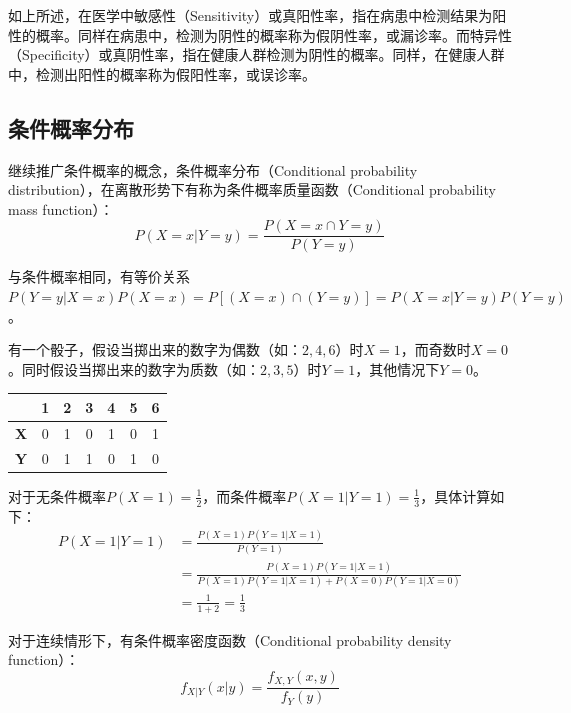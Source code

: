 \documentclass[11pt]{article}
\begin{document}
\begin{example}
\begin{remark}
        如上所述，在医学中敏感性（Sensitivity）或真阳性率，指在病患中检测结果为阳性的概率。同样在病患中，检测为阴性的概率称为假阴性率，或漏诊率。而特异性（Specificity）或真阴性率，指在健康人群检测为阴性的概率。同样，在健康人群中，检测出阳性的概率称为假阳性率，或误诊率。
    \end{remark}
\end{example}

\subsection{条件概率分布}

继续推广条件概率的概念，条件概率分布（Conditional probability distribution），在离散形势下有称为条件概率质量函数（Conditional probability mass function）：
\begin{equation*}
    P(X=x|Y=y) = \frac{P(X=x\cap Y=y)}{P(Y=y)}
\end{equation*}

与条件概率相同，有等价关系$P(Y=y|X=x)P(X=x) = P\left[(X=x)\cap (Y=y)\right] = P(X=x|Y=y)P(Y=y)$。

\begin{example}
    有一个骰子，假设当掷出来的数字为偶数（如：$2,4,6$）时$X=1$，而奇数时$X=0$。同时假设当掷出来的数字为质数（如：$2,3,5$）时$Y=1$，其他情况下$Y=0$。
    \begin{table}[ht!]
    \centering
    \begin{tabular}{@{}ccccccc@{}}
    \toprule
    & \textbf{1} & \textbf{2} & \textbf{3} & \textbf{4} & \textbf{5} & \textbf{6} \\ \midrule
    \textbf{X} & 0 & 1 & 0 & 1 & 0 & 1 \\
    \textbf{Y} & 0 & 1 & 1 & 0 & 1 & 0 \\ \bottomrule
    \end{tabular}
    \end{table}
    
    对于无条件概率$P(X=1) = \frac{1}{2}$，而条件概率$P(X=1|Y=1) = \frac{1}{3}$，具体计算如下：
    \begin{align*}
        P(X=1|Y=1) &= \frac{P(X=1)P(Y=1|X=1)}{P(Y=1)} \\
        &= \frac{P(X=1)P(Y=1|X=1)}{P(X=1)P(Y=1|X=1) + P(X=0)P(Y=1|X=0)} \\
        &= \frac{1}{1+2} = \frac{1}{3}
    \end{align*}
\end{example}

对于连续情形下，有条件概率密度函数（Conditional probability density function）：
\begin{equation*}
    f_{X|Y}(x|y) = \frac{f_{X,Y}(x,y)}{f_Y(y)}
\end{equation*}
\end{document}
